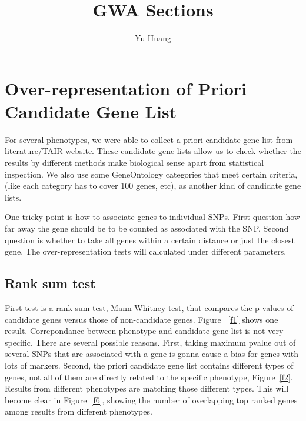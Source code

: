 \documentclass[a4paper,10pt]{article}
\title{GWA Sections}
\author{Yu Huang}
\begin{document}
\maketitle

\begin{abstract}

\end{abstract}

\tableofcontents


\section{Over-representation of Priori Candidate Gene List}
For several phenotypes, we were able to collect a priori candidate gene list from literature/TAIR website. These candidate gene lists allow us to check whether the results by different methods make biological sense apart from statistical inspection. We also use some GeneOntology categories that meet certain criteria, (like each category has to cover 100 genes, etc), as another kind of candidate gene lists.

One tricky point is how to associate genes to individual SNPs. First question how far away the gene should be to be counted as associated with the SNP. Second question is whether to take all genes within a certain distance or just the closest gene. The over-representation tests will calculated under different parameters.

\subsection{Rank sum test}

First test is a rank sum test, Mann-Whitney test, that compares the p-values of candidate genes versus those of non-candidate genes. Figure ~\ref{f1} shows one result. Correpondance between phenotype and candidate gene list is not very specific. There are several possible reasons. First, taking maximum pvalue out of several SNPs that are associated with a gene is gonna cause a bias for genes with lots of markers. Second, the priori candidate gene list contains different types of genes, not all of them are directly related to the specific phenotype, Figure~\ref{f2}. Results from different phenotypes are matching those different types. This will become clear in Figure~\ref{f6}, showing the number of overlapping top ranked genes among results from different phenotypes.
\end{document}
